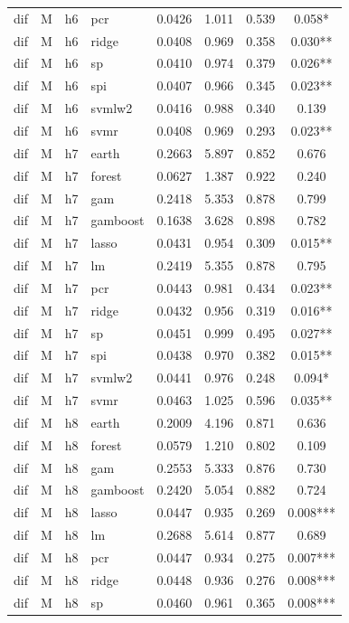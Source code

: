 \begin{ThreePartTable}
\begin{longtable}[t]{llclcccc}
dif & M & h6 & pcr & 0.0426 & 1.011 & 0.539 & 0.058*\\
dif & M & h6 & ridge & 0.0408 & 0.969 & 0.358 & 0.030**\\
dif & M & h6 & sp & 0.0410 & 0.974 & 0.379 & 0.026**\\
dif & M & h6 & spi & 0.0407 & 0.966 & 0.345 & 0.023**\\
dif & M & h6 & svmlw2 & 0.0416 & 0.988 & 0.340 & 0.139\\
dif & M & h6 & svmr & 0.0408 & 0.969 & 0.293 & 0.023**\\
\addlinespace
dif & M & h7 & earth & 0.2663 & 5.897 & 0.852 & 0.676\\
dif & M & h7 & forest & 0.0627 & 1.387 & 0.922 & 0.240\\
dif & M & h7 & gam & 0.2418 & 5.353 & 0.878 & 0.799\\
dif & M & h7 & gamboost & 0.1638 & 3.628 & 0.898 & 0.782\\
dif & M & h7 & lasso & 0.0431 & 0.954 & 0.309 & 0.015**\\
dif & M & h7 & lm & 0.2419 & 5.355 & 0.878 & 0.795\\
dif & M & h7 & pcr & 0.0443 & 0.981 & 0.434 & 0.023**\\
dif & M & h7 & ridge & 0.0432 & 0.956 & 0.319 & 0.016**\\
dif & M & h7 & sp & 0.0451 & 0.999 & 0.495 & 0.027**\\
dif & M & h7 & spi & 0.0438 & 0.970 & 0.382 & 0.015**\\
dif & M & h7 & svmlw2 & 0.0441 & 0.976 & 0.248 & 0.094*\\
dif & M & h7 & svmr & 0.0463 & 1.025 & 0.596 & 0.035**\\
\addlinespace
dif & M & h8 & earth & 0.2009 & 4.196 & 0.871 & 0.636\\
dif & M & h8 & forest & 0.0579 & 1.210 & 0.802 & 0.109\\
dif & M & h8 & gam & 0.2553 & 5.333 & 0.876 & 0.730\\
dif & M & h8 & gamboost & 0.2420 & 5.054 & 0.882 & 0.724\\
dif & M & h8 & lasso & 0.0447 & 0.935 & 0.269 & 0.008***\\
dif & M & h8 & lm & 0.2688 & 5.614 & 0.877 & 0.689\\
dif & M & h8 & pcr & 0.0447 & 0.934 & 0.275 & 0.007***\\
dif & M & h8 & ridge & 0.0448 & 0.936 & 0.276 & 0.008***\\
dif & M & h8 & sp & 0.0460 & 0.961 & 0.365 & 0.008***\\

\end{longtable}
\end{ThreePartTable}
